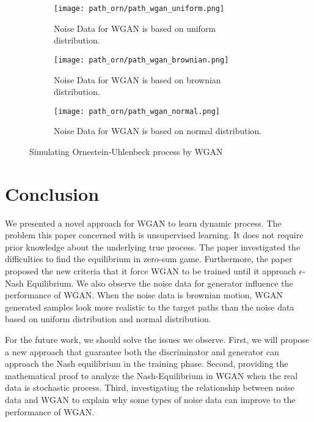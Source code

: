\documentclass{article}
\begin{document}
	
	\begin{figure}[h]
		\centering
		\begin{subfigure}[b]{0.6\textwidth}
			\texttt{[image: path\_orn/path\_wgan\_uniform.png]}
			\caption{Noise Data for WGAN is based on uniform distribution.}
		\end{subfigure}
		\begin{subfigure}[b]{0.6\textwidth}
			\texttt{[image: path\_orn/path\_wgan\_brownian.png]}
			\caption{Noise Data for WGAN is based on brownian distribution.}
		\end{subfigure}
		\begin{subfigure}[b]{0.6\textwidth}
			\texttt{[image: path\_orn/path\_wgan\_normal.png]}
			\caption{Noise Data for WGAN is based on normal distribution.}
		\end{subfigure}
		\caption{Simulating Ornestein-Uhlenbeck process by WGAN}
		\label{fig:path_wgan_ou}
	\end{figure}
	
	
	
	\section{Conclusion}
	
	We presented a novel approach for WGAN to learn dynamic process.
	The problem this paper concerned with is unsupervised learning.
	It does not require prior knowledge about the underlying true process.
	The paper investigated the difficulties to find the equilibrium in zero-sum game. 
	Furthermore, the paper proposed the new criteria that it force WGAN to be trained until it approach $\epsilon$-Nash Equilibrium. 
	We also observe the noise data for generator influence the performance of WGAN. 
	When the noise data is brownian motion, WGAN generated samples look more realistic to the target paths than the noise data based on uniform distribution and normal distribution.
	
	For the future work, we should solve the issues we observe. 
	First, we will propose a new approach that guarantee both the discriminator and generator can approach the Nash equilibrium in the training phase. 
	Second, providing the mathematical proof to analyze the Nash-Equilibrium in WGAN when the real data is stochastic process.
	Third, investigating the relationship between noise data and WGAN to explain why some types of noise data can improve to the performance of WGAN. 
	 

	\cleardoublepage
	
	
	
	
	
	

	
	
	

	
	
\end{document}
